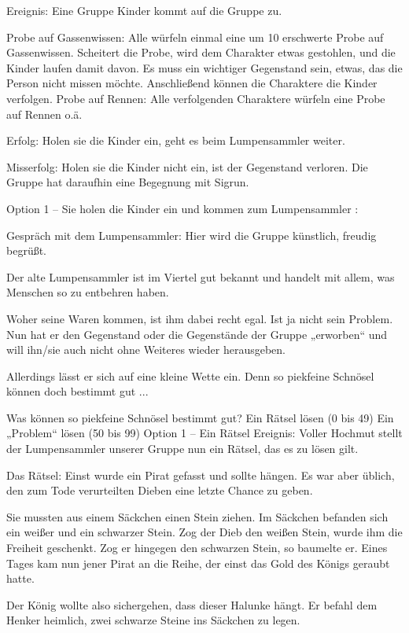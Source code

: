 Ereignis: Eine Gruppe Kinder kommt auf die Gruppe zu.

Probe auf Gassenwissen:
Alle würfeln einmal eine um 10 erschwerte Probe auf Gassenwissen.
Scheitert die Probe, wird dem Charakter etwas gestohlen, und die Kinder laufen damit davon. Es muss ein wichtiger Gegenstand sein, etwas, das die Person nicht missen möchte.
Anschließend können die Charaktere die Kinder verfolgen.
Probe auf Rennen:
Alle verfolgenden Charaktere würfeln eine Probe auf Rennen o.ä.

Erfolg: Holen sie die Kinder ein, geht es beim Lumpensammler weiter.

Misserfolg: Holen sie die Kinder nicht ein, ist der Gegenstand verloren.
Die Gruppe hat daraufhin eine Begegnung mit Sigrun.

Option 1 – Sie holen die Kinder ein und kommen zum Lumpensammler
:

Gespräch mit dem Lumpensammler: Hier wird die Gruppe künstlich, freudig begrüßt.

Der alte Lumpensammler ist im Viertel gut bekannt und handelt mit allem, was Menschen so zu entbehren haben.

Woher seine Waren kommen, ist ihm dabei recht egal. Ist ja nicht sein Problem. Nun hat er den Gegenstand oder die Gegenstände der Gruppe „erworben“ und will ihn/sie auch nicht ohne Weiteres wieder herausgeben.

Allerdings lässt er sich auf eine kleine Wette ein. Denn so piekfeine Schnösel können doch bestimmt gut ...

Was können so piekfeine Schnösel bestimmt gut?
Ein Rätsel lösen (0 bis 49)
Ein „Problem“ lösen (50 bis 99)
Option 1 – Ein Rätsel
Ereignis: Voller Hochmut stellt der Lumpensammler unserer Gruppe nun ein Rätsel, das es zu lösen gilt.


Das Rätsel:
Einst wurde ein Pirat gefasst und sollte hängen. Es war aber üblich, den zum Tode verurteilten Dieben eine letzte Chance zu geben.

Sie mussten aus einem Säckchen einen Stein ziehen. Im Säckchen befanden sich ein weißer und ein schwarzer Stein. Zog der Dieb den weißen Stein, wurde ihm die Freiheit geschenkt. Zog er hingegen den schwarzen Stein, so baumelte er. Eines Tages kam nun jener Pirat an die Reihe, der einst das Gold des Königs geraubt hatte.

Der König wollte also sichergehen, dass dieser Halunke hängt. Er befahl dem Henker heimlich, zwei schwarze Steine ins Säckchen zu legen.

